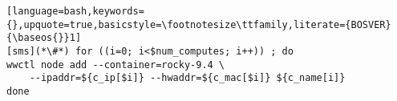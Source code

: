 \begin{lstlisting}[language=bash,keywords={},upquote=true,basicstyle=\footnotesize\ttfamily,literate={BOSVER}{\baseos{}}1]
[sms](*\#*) for ((i=0; i<$num_computes; i++)) ; do
wwctl node add --container=rocky-9.4 \
    --ipaddr=${c_ip[$i]} --hwaddr=${c_mac[$i]} ${c_name[i]}
done
\end{lstlisting}
